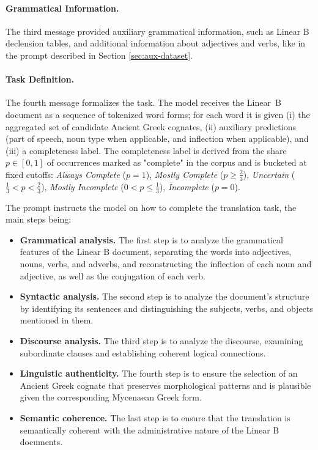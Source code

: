 \paragraph{Grammatical Information.}
The third message provided auxiliary grammatical information, such as Linear B declension tables, and additional information about adjectives and verbs, like in the prompt described in Section \ref{sec:aux-dataset}.

\paragraph{Task Definition.}
The fourth message formalizes the task. The model receives the Linear~B document as a sequence of tokenized word forms; for each word it is given (i) the aggregated set of candidate Ancient Greek cognates, (ii) auxiliary predictions (part of speech, noun type when applicable, and inflection when applicable), and (iii) a completeness label.
The completeness label is derived from the share $p\!\in\![0,1]$ of occurrences marked as "complete" in the corpus and is bucketed at fixed cutoffs:
\emph{Always Complete} ($p=1$), \emph{Mostly Complete} ($p \geq \frac{2}{3}$), \emph{Uncertain} ($\frac{1}{3} < p < \frac{2}{3}$), \emph{Mostly Incomplete} ($0< p \leq \frac{1}{3}$), \emph{Incomplete} ($p=0$).

The prompt instructs the model on how to complete the translation task, the main steps being:
\begin{itemize}
  \item \textbf{Grammatical analysis.} The first step is to analyze the grammatical features of the Linear B document, separating the words into adjectives, nouns, verbs, and adverbs, and reconstructing the inflection of each noun and adjective, as well as the conjugation of each verb.
  \item \textbf{Syntactic analysis.} The second step is to analyze the document's structure by identifying its sentences and distinguishing the subjects, verbs, and objects mentioned in them.
  \item \textbf{Discourse analysis.} The third step is to analyze the discourse, examining subordinate clauses and establishing coherent logical connections.
  \item \textbf{Linguistic authenticity.} The fourth step is to ensure the selection of an Ancient Greek cognate that preserves morphological patterns and is plausible given the corresponding Mycenaean Greek form.
  \item \textbf{Semantic coherence.} The last step is to ensure that the translation is semantically coherent with the administrative nature of the Linear B documents.
\end{itemize}

